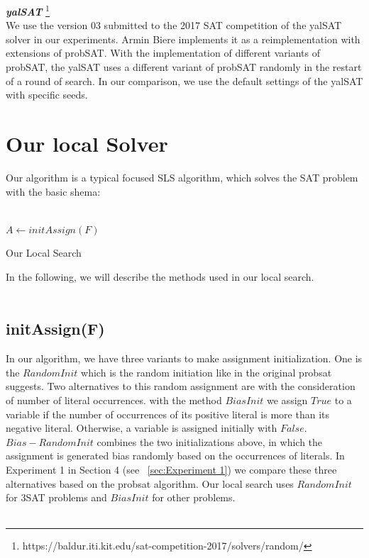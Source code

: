 \documentclass[12pt,a4paper,twoside]{scrartcl}
\numberwithin{equation}{section}
\begin{document}
\emph{\textbf{yalSAT}} \footnote{https://baldur.iti.kit.edu/sat-competition-2017/solvers/random/}\\
We use the version 03 submitted to the 2017 SAT competition of the yalSAT solver in our experiments. Armin Biere implements it as a reimplementation with extensions of probSAT.  With the implementation of different variants of probSAT, the yalSAT uses a different variant of probSAT randomly in the restart of a round of search. In our comparison, we use the default settings of the yalSAT with specific seeds.
\clearpage
\section{Our local Solver}
\label{sec:local}
 Our algorithm is a typical focused SLS algorithm, which solves the SAT problem with the basic shema:\\
\\
\begin{algorithm}[H]
  $A \leftarrow initAssign(F)$ \;
 \caption{Our Local Search}
\end{algorithm}
 In the following, we will describe the methods used in our local search.\\
\\
\subsection{initAssign(F)}
In our algorithm, we have three variants to make assignment initialization.
One is the $RandomInit$ which is the random initiation like in the original probsat suggests. Two alternatives to this random assignment are with the consideration of number of literal occurrences. with the method $BiasInit$ we assign $True$ to a variable if the number of occurrences of its positive literal is more than its negative literal. Otherwise, a variable is assigned initially with $False$. $Bias-RandomInit$ combines the two initializations above, in which the assignment is generated bias randomly based on the occurrences of literals.  In Experiment 1 in Section 4 (see ~\ref{sec:Experiment 1}) we compare these three alternatives based on the probsat algorithm. Our local search uses $RandomInit$ for 3SAT problems and $BiasInit$ for other problems.\\
\\
\end{document}
